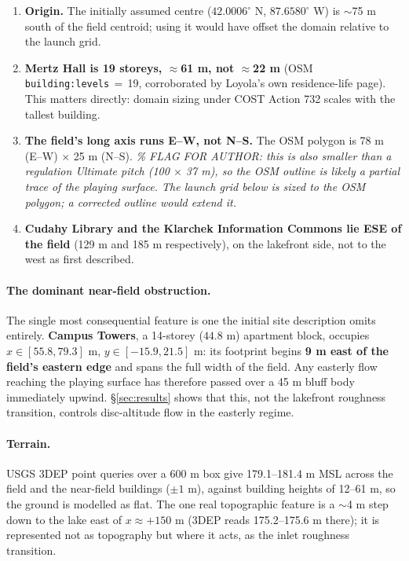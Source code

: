 \documentclass[11pt,letterpaper]{article}
\begin{document}
\begin{enumerate}[leftmargin=*,itemsep=2pt]
  \item \textbf{Origin.} The initially assumed centre
    ($42.0006^\circ$ N, $87.6580^\circ$ W) is $\sim$75 m south of the field
    centroid; using it would have offset the domain relative to the launch grid.
  \item \textbf{Mertz Hall is 19 storeys, $\approx$61 m, not $\approx$22 m}
    (OSM \texttt{building:levels}\,$=$\,19, corroborated by Loyola's own
    residence-life page). This matters directly: domain sizing under COST
    Action 732 scales with the tallest building.
  \item \textbf{The field's long axis runs E--W, not N--S.} The OSM polygon is
    78 m (E--W) $\times$ 25 m (N--S). \emph{\% FLAG FOR AUTHOR: this is also
    smaller than a regulation Ultimate pitch (100 $\times$ 37 m), so the OSM
    outline is likely a partial trace of the playing surface. The launch grid
    below is sized to the OSM polygon; a corrected outline would extend it.}
  \item \textbf{Cudahy Library and the Klarchek Information Commons lie ESE of
    the field} (129 m and 185 m respectively), on the lakefront side, not to
    the west as first described.
\end{enumerate}

\paragraph{The dominant near-field obstruction.} The single most consequential
feature is one the initial site description omits entirely. \textbf{Campus
Towers}, a 14-storey ($44.8$ m) apartment block, occupies
$x \in [55.8, 79.3]$ m, $y \in [-15.9, 21.5]$ m: its footprint begins
\textbf{9 m east of the field's eastern edge} and spans the full width of the
field. Any easterly flow reaching the playing surface has therefore passed
over a 45 m bluff body immediately upwind. \S\ref{sec:results} shows that this,
not the lakefront roughness transition, controls disc-altitude flow in the
easterly regime.

\paragraph{Terrain.} USGS 3DEP point queries over a 600 m box give
179.1--181.4 m MSL across the field and the near-field buildings ($\pm 1$ m),
against building heights of 12--61 m, so the ground is modelled as flat. The
one real topographic feature is a $\sim$4 m step down to the lake east of
$x \approx +150$ m (3DEP reads 175.2--175.6 m there); it is represented not as
topography but where it acts, as the inlet roughness transition.
\end{document}
